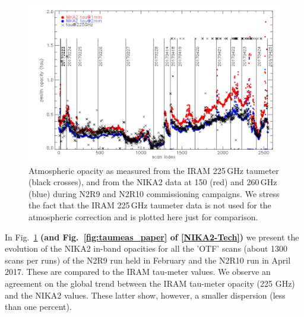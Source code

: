 \begin{figure}[ht]
\begin{center}
\includegraphics[width=\linewidth]{Figures/opacity_vs_index_N2R9_N2R10.png}
\caption[Zenith opacity monitoring during N2R9 and N2R10]{Atmospheric opacity as measured from the IRAM 225\,GHz
  taumeter (black crosses), and from the NIKA2 data at 150 (red) and 260\,GHz (blue) during 
  N2R9 and N2R10 commissioning campaigns.  We stress the fact that the IRAM 225\,GHz taumeter data is not used for the atmospheric correction and is plotted here just for comparison.
  \label{fig:taumeas}}
\end{center}
\end{figure}


In Fig.~\ref{fig:taumeas} {\bf(and Fig.~\ref{fig:taumeas_paper} of
  \ref{NIKA2-Tech}) } we present the evolution of the NIKA2 in-band
opacities for all the 'OTF' scans (about 1300 scans per runs) of the
N2R9 run held in February and the N2R10 run in April 2017. These are
compared to the IRAM tau-meter values. We observe an agreement on the global trend between the IRAM tau-meter opacity (225 GHz) and the NIKA2 values. These latter show, however,
a smaller dispersion (less than one percent).


